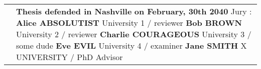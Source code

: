 \documentclass[10pt]{book}
\begin{document}
\begin{titlepage}
\begin{center}
\begin{minipage}{\glarg}
\begin{tabular}{p{7cm}p{10cm}}
\begin{minipage}{\plarg}
\hspace{-1.8cm}{\huge\bf cryptographiques}\vspace{5mm}

\hspace{-1.8cm}{\huge\bf pour un anonymat}\vspace{5mm}

\hspace{-1.8cm}{\huge\bf post-quantique}\vspace{5mm}



\end{minipage}
&
\begin{minipage}{\plarg}
{\large\bf Thesis defended in Nashville \vspace{1mm}\newline}
{\large\bf on February, 30th 2040\vspace{2mm}\newline}
{\large Jury : \vspace{2mm}\newline}
{\Large\bf Alice ABSOLUTIST \vspace{0mm}\newline}
{ University 1 \!/\! reviewer \vspace{1mm}\newline}
{\Large\bf Bob BROWN \vspace{0mm}\newline}
{ University 2 \!/\! reviewer \vspace{1mm}\newline}
{\Large\bf Charlie COURAGEOUS \vspace{0mm}\newline}
{ University 3 \!/\! some dude \vspace{1mm}\newline}
{\Large\bf Eve EVIL \vspace{0mm}\newline}
{ University 4 \!/\! examiner \vspace{1mm}\newline}
{\Large\bf Jane SMITH \vspace{0mm}\newline}
{X UNIVERSITY \!/\! PhD Advisor}

\end{minipage}
\end{tabular}

\end{minipage}
\end{center}
\end{titlepage}
\end{document}
